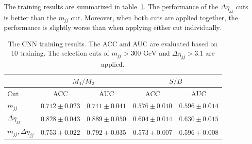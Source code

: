 \documentclass[12pt]{article}
\begin{document}
    The training results are summarized in table~\ref{tab:CWoLa_CNN_training_results}. The performance of the $\Delta\eta_{jj}$ cuts is better than the $m_{jj}$ cut. Moreover, when both cuts are applied together, the performance is slightly worse than when applying either cut individually.
    \begin{table}[htpb]
        \centering
        \caption{The CNN training results. The ACC and AUC are evaluated based on 10 training. The selection cuts of $m_{jj} > \text{300 GeV}$ and $\Delta\eta_{jj} > 3.1$ are applied.}
        \label{tab:CWoLa_CNN_training_results}
        \begin{tabular}{l|cc|cc}
                                      & \multicolumn{2}{c|}{$M_1 / M_2$}      & \multicolumn{2}{c}{$S / B$}           \\ \hline
            Cut                       & ACC               & AUC               & ACC               & AUC               \\ \hline
            $m_{jj}$                  & $0.712 \pm 0.023$ & $0.741 \pm 0.041$ & $0.576 \pm 0.010$ & $0.596 \pm 0.014$ \\
            $\Delta\eta_{jj}$         & $0.828 \pm 0.043$ & $0.889 \pm 0.050$ & $0.604 \pm 0.014$ & $0.630 \pm 0.015$ \\
            $m_{jj}, \Delta\eta_{jj}$ & $0.753 \pm 0.022$ & $0.792 \pm 0.035$ & $0.573 \pm 0.007$ & $0.596 \pm 0.008$
        \end{tabular}
    \end{table}
\end{document}
